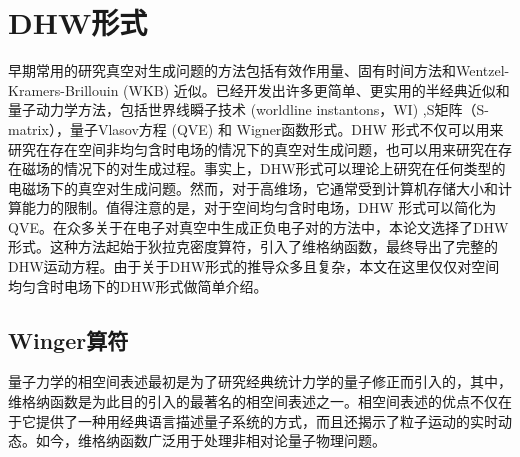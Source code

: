 
\chapter{DHW形式}
早期常用的研究真空对生成问题的方法包括有效作用量、固有时间方法和Wentzel-Kramers-Brillouin (WKB) 近似。已经开发出许多更简单、更实用的半经典近似和量子动力学方法，包括世界线瞬子技术 (worldline instantons，WI) ,S矩阵（S-matrix），量子Vlasov方程 (QVE) 和 Wigner函数形式\cite{2017xie}。DHW 形式不仅可以用来研究在存在空间非均匀含时电场的情况下的真空对生成问题，也可以用来研究在存在磁场的情况下的对生成过程。事实上，DHW形式可以理论上研究在任何类型的电磁场下的真空对生成问题。然而，对于高维场，它通常受到计算机存储大小和计算能力的限制。值得注意的是，对于空间均匀含时电场，DHW 形式可以简化为QVE。在众多关于在电子对真空中生成正负电子对的方法中，本论文选择了DHW形式。这种方法起始于狄拉克密度算符，引入了维格纳函数，最终导出了完整的DHW运动方程。由于关于DHW形式的推导众多且复杂，本文在这里仅仅对空间均匀含时电场下的DHW形式做简单介绍。

\section{Winger算符}

量子力学的相空间表述最初是为了研究经典统计力学的量子修正而引入的，其中，维格纳函数是为此目的引入的最著名的相空间表述之一。相空间表述的优点不仅在于它提供了一种用经典语言描述量子系统的方式，而且还揭示了粒子运动的实时动态。如今，维格纳函数广泛用于处理非相对论量子物理问题。

